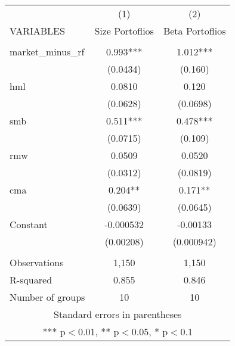 \begin{tabular}{lcc} \hline
 & (1) & (2) \\
VARIABLES & Size Portoflios & Beta Portoflios \\ \hline
 &  &  \\
market\_minus\_rf & 0.993*** & 1.012*** \\
 & (0.0434) & (0.160) \\
hml & 0.0810 & 0.120 \\
 & (0.0628) & (0.0698) \\
smb & 0.511*** & 0.478*** \\
 & (0.0715) & (0.109) \\
rmw & 0.0509 & 0.0520 \\
 & (0.0312) & (0.0819) \\
cma & 0.204** & 0.171** \\
 & (0.0639) & (0.0645) \\
Constant & -0.000532 & -0.00133 \\
 & (0.00208) & (0.000942) \\
 &  &  \\
Observations & 1,150 & 1,150 \\
R-squared & 0.855 & 0.846 \\
 Number of groups & 10 & 10 \\ \hline
\multicolumn{3}{c}{ Standard errors in parentheses} \\
\multicolumn{3}{c}{ *** p$<$0.01, ** p$<$0.05, * p$<$0.1} \\
\end{tabular}
